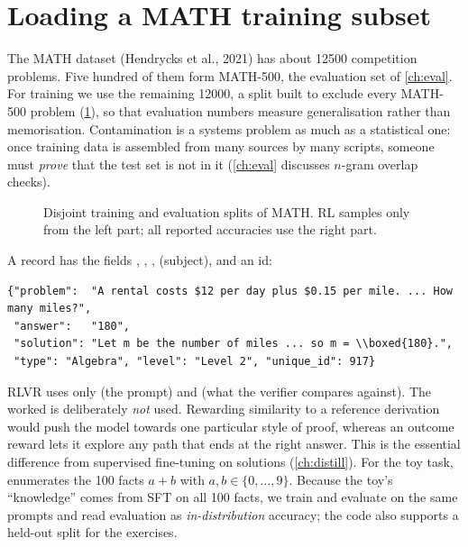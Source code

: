 \section{Loading a MATH training subset}\label{sec:grpo:data}

The MATH dataset (Hendrycks et al., 2021) has about \num{12500} competition problems.
Five hundred of them form MATH-500, the evaluation set of \cref{ch:eval}. For training we
use the remaining \num{12000}, a split built to exclude every MATH-500 problem
(\cref{fig:grpo:split}), so that evaluation numbers measure generalisation rather than
memorisation. Contamination is a systems problem as much as a statistical one: once
training data is assembled from many sources by many scripts, someone must
\emph{prove} that the test set is not in it (\cref{ch:eval} discusses $n$-gram overlap
checks).

\begin{figure}[ht]
\centering
{}
\caption{Disjoint training and evaluation splits of MATH. RL samples only from the left
part; all reported accuracies use the right part.}
\label{fig:grpo:split}
\end{figure}

A record has the fields , , , 
(subject),  and an id:

\begin{lstlisting}[style=plain,caption={Shape of one training record (contents abbreviated).},label={lst:grpo:record}]
{"problem":  "A rental costs $12 per day plus $0.15 per mile. ... How many miles?",
 "answer":   "180",
 "solution": "Let m be the number of miles ... so m = \\boxed{180}.",
 "type": "Algebra", "level": "Level 2", "unique_id": 917}
\end{lstlisting}

RLVR uses only  (the prompt) and  (what the verifier compares
against). The worked  is deliberately \emph{not} used. Rewarding similarity
to a reference derivation would push the model towards one particular style of proof,
whereas an outcome reward lets it explore any path that ends at the right answer. This is
the essential difference from supervised fine-tuning on solutions (\cref{ch:distill}).
For the toy task,  enumerates the 100 facts $a+b$ with
$a,b\in\{0,\dots,9\}$. Because the toy's ``knowledge'' comes from SFT on all 100 facts, we
train and evaluate on the same prompts and read evaluation as \emph{in-distribution}
accuracy; the code also supports a held-out split for the exercises.

